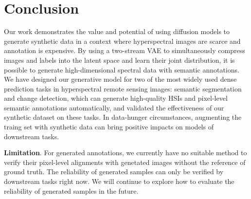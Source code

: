 \section{Conclusion}
\label{sec:conclusion}
Our work demonstrates the value and potential of using diffusion models to generate synthetic data in a context where hyperspectral images are scarce and annotation is expensive. By using a two-stream VAE to simultaneously compress images and labels into the latent space and learn their joint distribution, it is possible to generate high-dimensional spectral data with semantic annotations. We have designed our generative model for two of the most widely used dense prediction tasks in hyperspectral remote sensing images: semantic segmentation and change detection, which can generate high-quality HSIs and pixel-level semantic annotations automatically, and validated the effectiveness of our synthetic dataset on these tasks. In data-hunger circumstances, augmenting the traing set with synthetic data can bring positive impacts on models of downstream tasks. 

\noindent
\textbf{Limitation}. For generated annotations, we currently have no suitable method to verify their pixel-level alignments with genetated images without the reference of ground truth. The reliability of generated samples can only be verified by downstream tasks right now. We will continue to explore how to evaluate the reliability of generated samples in the future.



